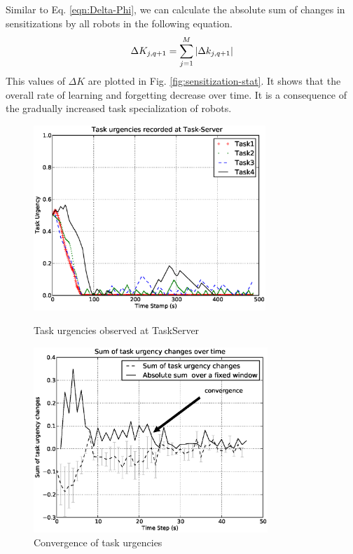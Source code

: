 \documentclass{llncs}
\begin{document}
%
Similar to Eq. \ref{eqn:Delta-Phi}, we can calculate the absolute sum of changes in sensitizations by all robots in the following equation.
% 
\begin{equation}
\small 
\Delta K_{j, q+1} = \sum_{j=1}^{M} \left | \Delta k_{j, q+1} \right |
\label{eqn:Delta-K}
\end{equation}
This values of $\Delta K$ are plotted in Fig. \ref{fig:sensitization-stat}. It shows that the overall rate of learning and forgetting decrease over time. It is a consequence of  the gradually increased task specialization of robots.
%
\begin{figure}
\centering
\includegraphics[height=7cm, angle=0]
{images/global/GlobalPlotUrgencyLog-2010Feb18-151600-clear.eps}
\caption{\small Task urgencies observed at TaskServer}
\label{fig:raw-urgencies} %
\centering
\includegraphics[height=7cm, angle=0]{images/global/TaskUrgencyConvergence-step2-th-p1.eps}
\caption{\small Convergence of task urgencies}
\label{fig:urgency-convergence} %
\end{figure}
\end{document}
